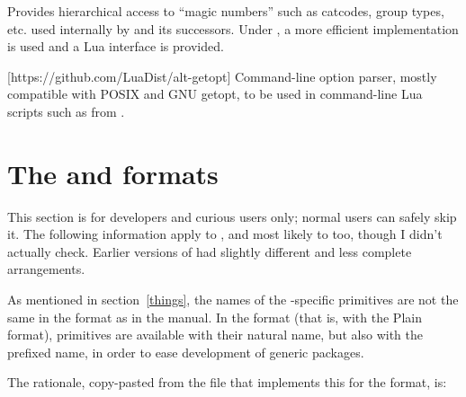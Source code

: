 \documentclass{lltxdoc}
\begin{document}
Provides hierarchical access to ``magic numbers'' such as catcodes, group
types, etc. used internally by \tex and its successors. Under \luatex, a more
efficient implementation is used and a Lua interface is provided.

[https://github.com/LuaDist/alt-getopt]
Command-line option parser, mostly compatible with POSIX and GNU getopt, to be
used in command-line Lua scripts such as  from
.

\section{The  and  formats}\label{formats}

This section is for developers and curious users only; normal users can safely
skip it. The following information apply to , and most likely to
 too, though I didn't actually check. Earlier versions of \texlive
had slightly different and less complete arrangements.

As mentioned in section~\ref{things}, the names of the \luatex-specific
primitives are not the same in the  format as in the \luatex
manual. In the  format (that is, \luatex with the Plain format),
primitives are available with their natural name, but also with the prefixed
name, in order to ease development of generic packages.

The rationale, copy-pasted from the file  that
implements this for the  format, is:
\end{document}
